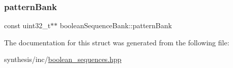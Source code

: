 \mbox{\label{structboolean_sequence_bank_ab4a96dcfaa6c996617b865e1be41a932}} 
\subsubsection{\texorpdfstring{pattern\+Bank}{patternBank}}
{\footnotesize\ttfamily const uint32\+\_\+t$\ast$$\ast$ boolean\+Sequence\+Bank\+::pattern\+Bank}



The documentation for this struct was generated from the following file\+:\begin{DoxyCompactItemize}
\item 
synthesis/inc/\mbox{\hyperlink{boolean__sequences_8hpp}{boolean\+\_\+sequences.\+hpp}}\end{DoxyCompactItemize}
